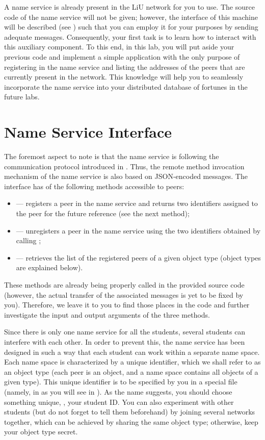 \documentclass[a4paper]{article}
\begin{document}
A name service is already present in the LiU network for you to use. The source
code of the name service will not be given; however, the interface of this
machine will be described (see ) such that you can employ it for
your purposes by sending adequate messages. Consequently, your first task is to
learn how to interact with this auxiliary component. To this end, in this lab,
you will put aside your previous code and implement a simple application with
the only purpose of registering in the name service and listing the addresses of
the peers that are currently present in the network. This knowledge will help
you to seamlessly incorporate the name service into your distributed database of
fortunes in the future labs.

\section{Name Service Interface} 
The foremost aspect to note is that the name service is following the
communication protocol introduced in . Thus, the remote method
invocation mechanism of the name service is also based on JSON-encoded messages.
The interface has of the following methods accessible to peers:
\begin{itemize}

  \item {} --- registers a peer in the name service and returns two
  identifiers assigned to the peer for the future reference (see the next
  method);

  \item {} --- unregisters a peer in the name service using the
  two identifiers obtained by calling ;

  \item {} --- retrieves the list of the registered peers of a
  given object type (object types are explained below).

\end{itemize}
These methods are already being properly called in the provided source code
(however, the actual transfer of the associated messages is yet to be fixed by
you). Therefore, we leave it to you to find those places in the code and further
investigate the input and output arguments of the three methods.

Since there is only one name service for all the students, several students can
interfere with each other. In order to prevent this, the name service has been
designed in such a way that each student can work within a separate name space.
Each name space is characterized by a unique identifier, which we shall refer to
as an object type (each peer is an object, and a name space contains all objects
of a given type). This unique identifier is to be specified by you in a special
file (namely, in  as you will see in ). As
the name suggests, you should choose something unique, \eg, your student ID. You
can also experiment with other students (but do not forget to tell them
beforehand) by joining several networks together, which can be achieved by
sharing the same object type; otherwise, keep your object type secret.
\end{document}
